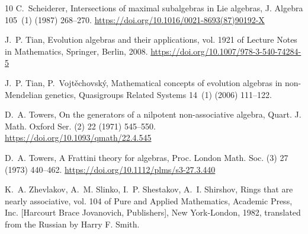\documentclass[12pt,reqno]{amsart}
\theoremstyle{definition}
\theoremstyle{remark}
\numberwithin{equation}{section}
\begin{document}
\begin{thebibliography}{10}
C.~Scheiderer, Intersections of maximal subalgebras in {L}ie algebras, J.
  Algebra 105~(1) (1987) 268--270.
\newline\urlprefix\url{https://doi.org/10.1016/0021-8693(87)90192-X}

J.~P. Tian, Evolution algebras and their applications, vol. 1921 of Lecture
  Notes in Mathematics, Springer, Berlin, 2008.
\newline\urlprefix\url{https://doi.org/10.1007/978-3-540-74284-5}

J.~P. Tian, P.~Vojt\v{e}chovsk\'{y}, Mathematical concepts of evolution algebras
  in non-{M}endelian genetics, Quasigroups Related Systems 14~(1) (2006)
  111--122.

D.~A. Towers, On the generators of a nilpotent non-associative algebra, Quart.
  J. Math. Oxford Ser. (2) 22 (1971) 545--550.
\newline\urlprefix\url{https://doi.org/10.1093/qmath/22.4.545}

D.~A. Towers, A {F}rattini theory for algebras, Proc. London Math. Soc. (3) 27
  (1973) 440--462.
\newline\urlprefix\url{https://doi.org/10.1112/plms/s3-27.3.440}

K.~A. Zhevlakov, A.~M. Slinko, I.~P. Shestakov, A.~I. Shirshov, Rings that are
  nearly associative, vol. 104 of Pure and Applied Mathematics, Academic Press,
  Inc. [Harcourt Brace Jovanovich, Publishers], New York-London, 1982,
  translated from the Russian by Harry F. Smith.

\end{thebibliography}
\end{document}
